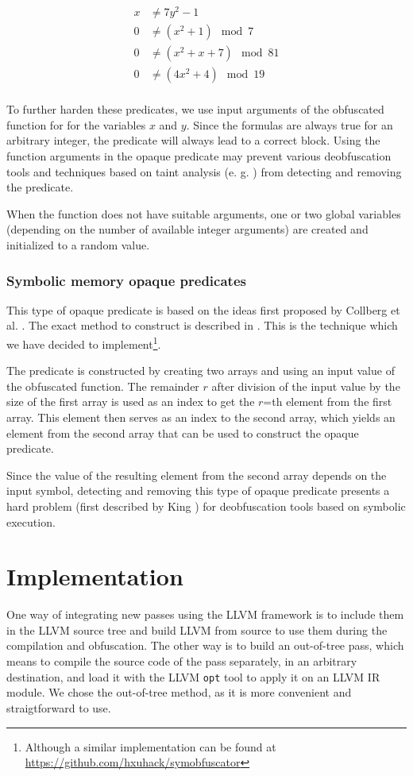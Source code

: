 \documentclass[
  digital, %
  notable,   %
  twoside, %
  nolof,     %
  nolot,     %
]{fithesis3}
\theoremstyle{definition}
\begin{document}
$$
\begin{aligned}
x &\neq 7y^2 - 1  \\
0 &\neq (x^2 + 1) \mod7 \\
0 &\neq (x^2 + x + 7) \mod 81  \\
0 &\neq (4x^2 + 4) \mod 19 \\
\end{aligned}
$$

To further harden these predicates, we use input arguments of the obfuscated function for for the variables $x$ and $y$. Since the formulas are always true for an arbitrary integer, the predicate will always lead to a correct block. Using the function arguments in the opaque predicate may prevent various deobfuscation tools and techniques based on taint analysis (e. g. \cite{generic_deobfuscation}) from detecting and removing the predicate. 

When the function does not have suitable arguments, one or two global variables (depending on the number of available integer arguments) are created and initialized to a random value. 

\subsection{Symbolic memory opaque predicates} \label{sec:sym_mem}
This type of opaque predicate is based on the ideas first proposed by Collberg et al. \cite{manufacturing_opaque}. The exact method to construct is described in \cite{bi_opaque}. This is the technique which we have decided to implement\footnote{Although a similar implementation can be found at \url{https://github.com/hxuhack/symobfuscator}}. 

The predicate is constructed by creating two arrays and using an input value of the obfuscated function. The remainder $r$ after division of the input value by the size of the first array is used as an index to get the $r$=th element from the first array. This element then serves as an index to the second array, which yields an element from the second array that can be used to construct the opaque predicate. 

Since the value of the resulting element from the second array depends on the input symbol, detecting and removing this type of opaque predicate presents a hard problem (first described by King \cite{King1976}) for deobfuscation tools based on symbolic execution. 

\chapter{Implementation}
One way of integrating new passes using the LLVM framework is to include them in the LLVM source tree and build LLVM from source to use them during the compilation and obfuscation. The other way is to build an out-of-tree pass, which means to compile the source code of the pass separately, in an arbitrary destination, and load it with the LLVM \texttt{opt} tool to apply it on an LLVM IR module. We chose the out-of-tree method, as it is more convenient and straigtforward to use. 
\end{document}
